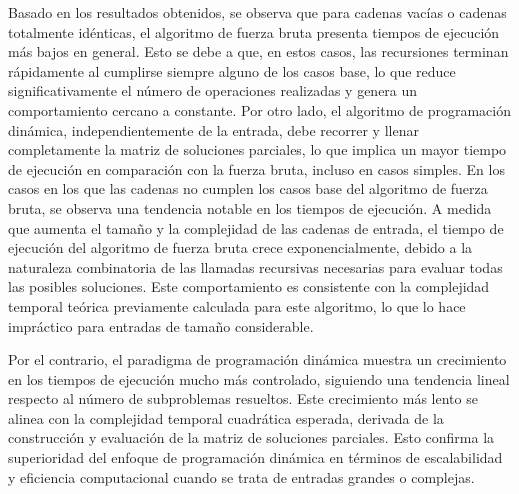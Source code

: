 Basado en los resultados obtenidos, se observa que para cadenas vacías o cadenas totalmente idénticas, el algoritmo de fuerza bruta presenta tiempos de ejecución más bajos en general. Esto se debe a que, en estos casos, las recursiones terminan rápidamente al cumplirse siempre alguno de los casos base, lo que reduce significativamente el número de operaciones realizadas y genera un comportamiento cercano a constante. Por otro lado, el algoritmo de programación dinámica, independientemente de la entrada, debe recorrer y llenar completamente la matriz de soluciones parciales, lo que implica un mayor tiempo de ejecución en comparación con la fuerza bruta, incluso en casos simples.
En los casos en los que las cadenas no cumplen los casos base del algoritmo de fuerza bruta, se observa una tendencia notable en los tiempos de ejecución. A medida que aumenta el tamaño y la complejidad de las cadenas de entrada, el tiempo de ejecución del algoritmo de fuerza bruta crece exponencialmente, debido a la naturaleza combinatoria de las llamadas recursivas necesarias para evaluar todas las posibles soluciones. Este comportamiento es consistente con la complejidad temporal teórica previamente calculada para este algoritmo, lo que lo hace impráctico para entradas de tamaño considerable.

Por el contrario, el paradigma de programación dinámica muestra un crecimiento en los tiempos de ejecución mucho más controlado, siguiendo una tendencia lineal respecto al número de subproblemas resueltos. Este crecimiento más lento se alinea con la complejidad temporal cuadrática esperada, derivada de la construcción y evaluación de la matriz de soluciones parciales. Esto confirma la superioridad del enfoque de programación dinámica en términos de escalabilidad y eficiencia computacional cuando se trata de entradas grandes o complejas.